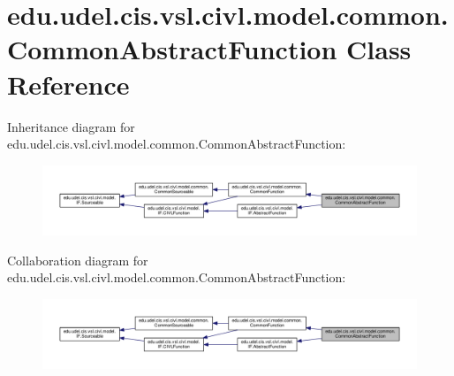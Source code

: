 \hypertarget{classedu_1_1udel_1_1cis_1_1vsl_1_1civl_1_1model_1_1common_1_1CommonAbstractFunction}{}\section{edu.\+udel.\+cis.\+vsl.\+civl.\+model.\+common.\+Common\+Abstract\+Function Class Reference}
\label{classedu_1_1udel_1_1cis_1_1vsl_1_1civl_1_1model_1_1common_1_1CommonAbstractFunction}


Inheritance diagram for edu.\+udel.\+cis.\+vsl.\+civl.\+model.\+common.\+Common\+Abstract\+Function\+:
\nopagebreak
\begin{figure}[H]
\begin{center}
\leavevmode
\includegraphics[width=350pt]{classedu_1_1udel_1_1cis_1_1vsl_1_1civl_1_1model_1_1common_1_1CommonAbstractFunction__inherit__graph}
\end{center}
\end{figure}


Collaboration diagram for edu.\+udel.\+cis.\+vsl.\+civl.\+model.\+common.\+Common\+Abstract\+Function\+:
\nopagebreak
\begin{figure}[H]
\begin{center}
\leavevmode
\includegraphics[width=350pt]{classedu_1_1udel_1_1cis_1_1vsl_1_1civl_1_1model_1_1common_1_1CommonAbstractFunction__coll__graph}
\end{center}
\end{figure}
